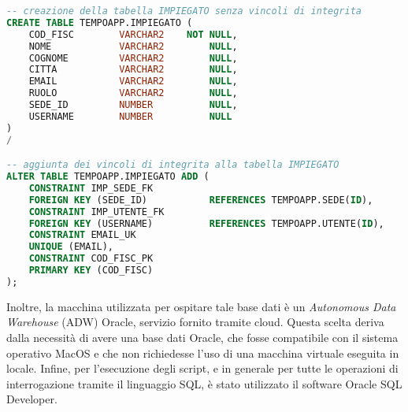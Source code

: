 \lstset{basicstyle=\ttfamily\footnotesize,breaklines=true}
\begin{lstlisting}[language=sql]
-- creazione della tabella IMPIEGATO senza vincoli di integrita
CREATE TABLE TEMPOAPP.IMPIEGATO (
    COD_FISC        VARCHAR2    NOT NULL,
    NOME            VARCHAR2        NULL,
    COGNOME         VARCHAR2        NULL,
    CITTA           VARCHAR2        NULL,
    EMAIL           VARCHAR2        NULL,
    RUOLO           VARCHAR2        NULL,
    SEDE_ID         NUMBER          NULL,
    USERNAME        NUMBER          NULL
)
/

-- aggiunta dei vincoli di integrita alla tabella IMPIEGATO
ALTER TABLE TEMPOAPP.IMPIEGATO ADD (
    CONSTRAINT IMP_SEDE_FK
    FOREIGN KEY (SEDE_ID)           REFERENCES TEMPOAPP.SEDE(ID),
    CONSTRAINT IMP_UTENTE_FK
    FOREIGN KEY (USERNAME)          REFERENCES TEMPOAPP.UTENTE(ID),
    CONSTRAINT EMAIL_UK
    UNIQUE (EMAIL),
    CONSTRAINT COD_FISC_PK
    PRIMARY KEY (COD_FISC)
);
\end{lstlisting}

Inoltre, la macchina utilizzata per ospitare tale base dati è un \textit{Autonomous Data Warehouse} (ADW) Oracle, servizio fornito tramite cloud. Questa scelta deriva dalla necessità di avere una base dati Oracle, che fosse compatibile con il sistema operativo MacOS e che non richiedesse l'uso di una macchina virtuale eseguita in locale. Infine, per l'esecuzione degli script, e in generale per tutte le operazioni di interrogazione tramite il linguaggio SQL, è stato utilizzato il software Oracle SQL Developer.